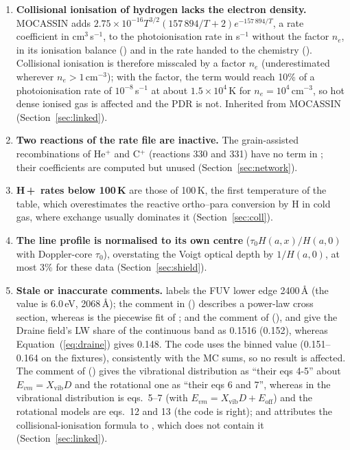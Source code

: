\begin{enumerate}
\item \textbf{Collisional ionisation of hydrogen lacks the electron density.}
  MOCASSIN adds $2.75\times10^{-16}T^{3/2}(157\,894/T+2)e^{-157\,894/T}$, a rate
  coefficient in cm$^3$\,s$^{-1}$, to the photoionisation rate in s$^{-1}$ without the
  factor $n_e$, in its ionisation balance ()
  and in the rate handed to the chemistry (). Collisional
  ionisation is therefore misscaled by a factor $n_e$ (underestimated wherever
  $n_e>1$\,cm$^{-3}$); with the factor, the term would reach 10\% of a
  photoionisation rate of $10^{-8}$\,s$^{-1}$ at about $1.5\times10^4$\,K for
  $n_e=10^4$\,cm$^{-3}$, so hot dense ionised gas is affected and the PDR is not.
  Inherited from MOCASSIN (Section~\ref{sec:linked}).
\item \textbf{Two reactions of the rate file are inactive.} The grain-assisted
  recombinations of He$^+$ and C$^+$ (reactions 330 and 331) have no term in
  ; their coefficients are computed but unused
  (Section~\ref{sec:network}).
\item \textbf{H\,+\,\Htwo{} rates below 100\,K} are those of 100\,K, the first
  temperature of the \citet{Lique2015} table, which overestimates the reactive
  ortho--para conversion by H in cold gas, where \Hp{} exchange usually
  dominates it (Section~\ref{sec:coll}).
\item \textbf{The \Htwo{} line profile is normalised to its own centre}
  ($\tau_0H(a,x)/H(a,0)$ with Doppler-core $\tau_0$), overstating the Voigt optical
  depth by $1/H(a,0)$, at most 3\% for these data (Section~\ref{sec:shield}).
\item \textbf{Stale or inaccurate comments.}  labels
  the FUV lower edge 2400\,\AA{} (the value is 6.0\,eV, 2068\,\AA); the comment in
   () describes a power-law
  \Htwo{} cross section, whereas  is the piecewise fit of
  \citet{Yan1998}; and the comment of 
  (),  and  give the Draine
  field's LW share of the continuous band as 0.1516 (0.152), whereas
  Equation~(\ref{eq:draine}) gives 0.148. The code uses the binned value
  (0.151--0.164 on the fixtures), consistently with the MC sums, so no result
  is affected. The comment of  ()
  gives the vibrational distribution as ``their eqs 4-5'' about
  $E_{vm}=X_{\mathrm{vib}}D$ and the rotational one as ``their eqs 6 and 7'', whereas
  in \citet{TakahashiUehara2001} the vibrational distribution is eqs.~5--7 (with
  $E_{vm}=X_{\mathrm{vib}}D+E_{\mathrm{off}}$) and the rotational models are eqs.~12
  and 13 (the code is right); and  attributes the
  collisional-ionisation formula to \citet{DrakeUlrich1980}, which does not
  contain it (Section~\ref{sec:linked}).
\end{enumerate}
